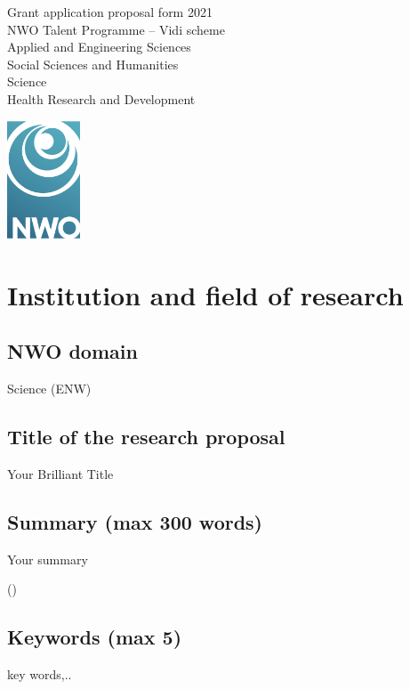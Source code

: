\documentclass[10pt]{article}
\newcommand{\wordcount}[1]{}
\begin{document}
	\noindent
	\begin{minipage}{.85\linewidth}
		\color{headerblue}
		{\rmfamily\fontsize{20}{20}\selectfont Grant application proposal form 2021}\\[0.3cm]
		{\rmfamily\fontsize{15}{15}\selectfont NWO Talent Programme -- Vidi scheme}\\[0.25cm]
		{\rmfamily\fontsize{11}{11}\selectfont
		Applied and Engineering Sciences\\
		Social Sciences and Humanities\\
		Science\\
		Health Research and Development}
	\end{minipage}%
	\begin{minipage}{.15\linewidth}
		\includegraphics[height=3.5cm]{NWO_logo}
	\end{minipage}
	\section{Institution and field of research}
	
	\subsection{NWO domain}
	Science (ENW)
	\subsection{Title of the research proposal}
	Your Brilliant Title
	\subsection{Summary (max 300 words)}
	Your summary

	(\wordcount{Summary})
	\subsection{Keywords (max 5)}
	key words,..
	
\end{document}
